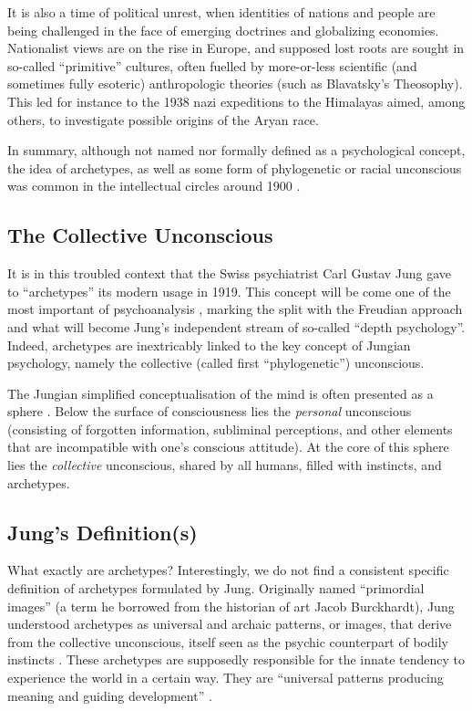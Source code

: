 \documentclass[
]{book}
\begin{document}
It is also a time of political unrest, when identities of nations and people are being challenged in the face of emerging doctrines and globalizing economies. Nationalist views are on the rise in Europe, and supposed lost roots are sought in so-called ``primitive'' cultures, often fuelled by more-or-less scientific (and sometimes fully esoteric) anthropologic theories (such as Blavatsky's Theosophy). This led for instance to the 1938 nazi expeditions to the Himalayas aimed, among others, to investigate possible origins of the Aryan race.

In summary, although not named nor formally defined as a psychological concept, the idea of archetypes, as well as some form of phylogenetic or racial unconscious was common in the intellectual circles around 1900 \citep{shamdasani2003cult}.

\hypertarget{the-collective-unconscious}{%
\subsection{The Collective Unconscious}\label{the-collective-unconscious}}

It is in this troubled context that the Swiss psychiatrist Carl Gustav Jung gave to ``archetypes'' its modern usage in 1919. This concept will be come one of the most important of psychoanalysis \citep{roesler2012archetypes}, marking the split with the Freudian approach and what will become Jung's independent stream of so-called ``depth psychology''. Indeed, archetypes are inextricably linked to the key concept of Jungian psychology, namely the collective (called first ``phylogenetic'') unconscious.

The Jungian simplified conceptualisation of the mind is often presented as a sphere \citep{cann1986jungian}. Below the surface of consciousness lies the \emph{personal} unconscious (consisting of forgotten information, subliminal perceptions, and other elements that are incompatible with one's conscious attitude). At the core of this sphere lies the \emph{collective} unconscious, shared by all humans, filled with instincts, and archetypes.

\hypertarget{jungs-definitions}{%
\subsection{Jung's Definition(s)}\label{jungs-definitions}}

What exactly are archetypes? Interestingly, we do not find a consistent specific definition of archetypes formulated by Jung. Originally named ``primordial images'' (a term he borrowed from the historian of art Jacob Burckhardt), Jung understood archetypes as universal and archaic patterns, or images, that derive from the collective unconscious, itself seen as the psychic counterpart of bodily instincts \citep{feist2009theories}. These archetypes are supposedly responsible for the innate tendency to experience the world in a certain way. They are ``universal patterns producing meaning and guiding development'' \citep{roesler2012archetypes}.
\end{document}
